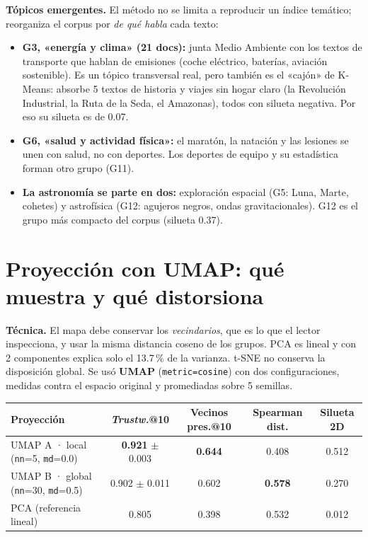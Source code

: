 \documentclass[10pt,a4paper]{article}
\begin{document}
\textbf{Tópicos emergentes.} El método no se limita a reproducir un índice temático; reorganiza el corpus por
\emph{de qué habla} cada texto:
\begin{itemize}
\item \textbf{G3, «energía y clima» (21 docs):} junta Medio Ambiente con los textos de transporte que hablan
de emisiones (coche eléctrico, baterías, aviación sostenible). Es un tópico transversal real, pero también es
el «cajón» de K-Means: absorbe 5 textos de historia y viajes sin hogar claro (la Revolución Industrial, la
Ruta de la Seda, el Amazonas), todos con silueta negativa. Por eso su silueta es de 0.07.
\item \textbf{G6, «salud y actividad física»:} el maratón, la natación y las lesiones se unen con salud, no con
deportes. Los deportes de equipo y su estadística forman otro grupo (G11).
\item \textbf{La astronomía se parte en dos:} exploración espacial (G5: Luna, Marte, cohetes) y astrofísica
(G12: agujeros negros, ondas gravitacionales). G12 es el grupo más compacto del corpus (silueta 0.37).
\end{itemize}

\section{Proyección con UMAP: qué muestra y qué distorsiona}

\textbf{Técnica.} El mapa debe conservar los \emph{vecindarios}, que es lo que el lector inspecciona, y usar la
misma distancia coseno de los grupos. PCA es lineal y con 2 componentes explica solo el 13.7\,\% de la
varianza. t-SNE no conserva la disposición global. Se usó \textbf{UMAP} (\texttt{metric=cosine}) con dos
configuraciones, medidas contra el espacio original y promediadas sobre 5 semillas.

\begin{table}[H]
\centering\footnotesize\setlength{\tabcolsep}{5pt}
\begin{tabular}{@{}lcccc@{}}
\toprule
\textbf{Proyección} & \textbf{\emph{Trustw.}@10} & \textbf{Vecinos pres.@10} & \textbf{Spearman dist.} & \textbf{Silueta 2D} \\
\midrule
UMAP A · local (\texttt{nn}=5, \texttt{md}=0.0) & \textbf{0.921} $\pm$ 0.003 & \textbf{0.644} & 0.408 & 0.512 \\
UMAP B · global (\texttt{nn}=30, \texttt{md}=0.5) & 0.902 $\pm$ 0.011 & 0.602 & \textbf{0.578} & 0.270 \\
PCA (referencia lineal)                                            & 0.805 & 0.398 & 0.532 & 0.012 \\
\bottomrule
\end{tabular}
\end{table}
\end{document}

